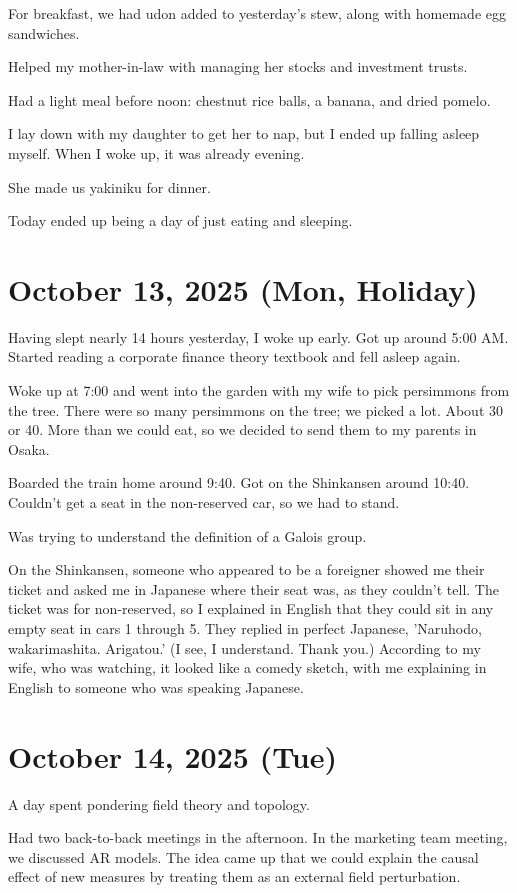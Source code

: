 \documentclass[uplatex]{jsarticle}
\begin{document}
For breakfast, we had udon added to yesterday's stew, along with homemade egg sandwiches.

Helped my mother-in-law with managing her stocks and investment trusts.

Had a light meal before noon: chestnut rice balls, a banana, and dried pomelo.

I lay down with my daughter to get her to nap, but I ended up falling asleep myself. When I woke up, it was already evening.

She made us yakiniku for dinner.

Today ended up being a day of just eating and sleeping.

\section{October 13, 2025 (Mon, Holiday)}

Having slept nearly 14 hours yesterday, I woke up early. Got up around 5:00 AM.
Started reading a corporate finance theory textbook and fell asleep again.

Woke up at 7:00 and went into the garden with my wife to pick persimmons from the tree.
There were so many persimmons on the tree; we picked a lot. About 30 or 40.
More than we could eat, so we decided to send them to my parents in Osaka.

Boarded the train home around 9:40.
Got on the Shinkansen around 10:40. Couldn't get a seat in the non-reserved car, so we had to stand.

Was trying to understand the definition of a Galois group.

On the Shinkansen, someone who appeared to be a foreigner showed me their ticket and asked me in Japanese where their seat was, as they couldn't tell.
The ticket was for non-reserved, so I explained in English that they could sit in any empty seat in cars 1 through 5.
They replied in perfect Japanese, 'Naruhodo, wakarimashita. Arigatou.' (I see, I understand. Thank you.)
According to my wife, who was watching, it looked like a comedy sketch, with me explaining in English to someone who was speaking Japanese.

\section{October 14, 2025 (Tue)}

A day spent pondering field theory and topology.

Had two back-to-back meetings in the afternoon.
In the marketing team meeting, we discussed AR models.
The idea came up that we could explain the causal effect of new measures by treating them as an external field perturbation.
\end{document}
